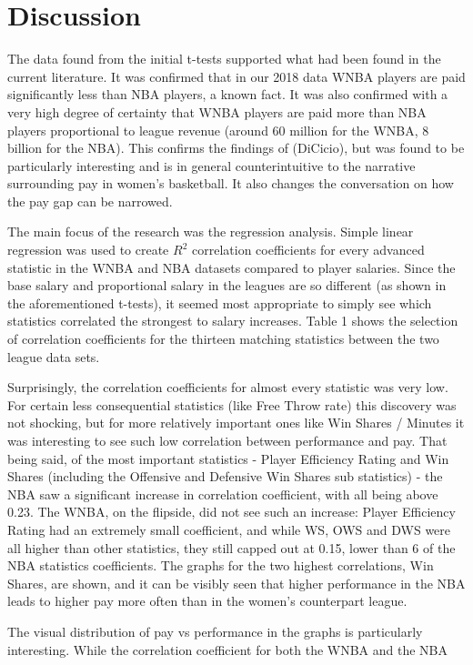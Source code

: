 \documentclass[12pt]{article}
\begin{document}
\section{Discussion}
The data found from the initial t-tests supported what had been found in the current literature. It was confirmed that in our 2018 data WNBA players are 
paid significantly less than NBA players, a known fact. It was also confirmed with a very high degree of certainty that WNBA players are paid more than 
NBA players proportional to league revenue (around 60 million for the WNBA, 8 billion for the NBA). This confirms the findings of (DiCicio), but was found 
to be particularly interesting and is in general counterintuitive to the narrative surrounding pay in women’s basketball. It also changes the conversation 
on how the pay gap can be narrowed.
\par
The main focus of the research was the regression analysis. Simple linear regression was used to create $R^2$ correlation coefficients for every advanced 
statistic in the WNBA and NBA datasets compared to player salaries. Since the base salary and proportional salary in the leagues are so different (as 
shown in the aforementioned t-tests), it seemed most appropriate to simply see which statistics correlated the strongest to salary increases. Table 1 
shows the selection of correlation coefficients for the thirteen matching statistics between the two league data sets.
\par
Surprisingly, the correlation coefficients for almost every statistic was very low. For certain less consequential statistics (like Free Throw rate) this 
discovery was not shocking, but for more relatively important ones like Win Shares / Minutes it was interesting to see such low correlation between 
performance and pay. That being said, of the most important statistics - Player Efficiency Rating and Win Shares (including the Offensive and Defensive 
Win Shares sub statistics) - the NBA saw a significant increase in correlation coefficient, with all being above 0.23. The WNBA, on the flipside, did not 
see such an increase: Player Efficiency Rating had an extremely small coefficient, and while WS, OWS and DWS were all higher than other statistics, they 
still capped out at 0.15, lower than 6 of the NBA statistics coefficients. The graphs for the two highest correlations, Win Shares, are shown, and it can 
be visibly seen that higher performance in the NBA leads to higher pay more often than in the women’s counterpart league.
\par
The visual distribution of pay vs performance in the graphs is particularly interesting. While the correlation coefficient for both the WNBA and the NBA 
\end{document}
